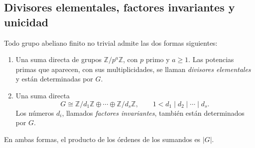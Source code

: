 \subsection{Divisores elementales, factores invariantes y unicidad}
\begin{teo}\label{teo:C10-clasificacion}
Todo grupo abeliano finito no trivial admite las dos formas siguientes:
\begin{enumerate}
\item Una suma directa de grupos $\mathbb Z/p^{a}\mathbb Z$, con $p$ primo y $a\ge1$. Las potencias primas que aparecen, con sus multiplicidades, se llaman \emph{divisores elementales} y están determinadas por $G$.
\item Una suma directa
\[
G\cong\mathbb Z/d_1\mathbb Z\oplus\cdots\oplus\mathbb Z/d_s\mathbb Z,
\qquad 1<d_1\mid d_2\mid\cdots\mid d_s.
\]
Los números $d_i$, llamados \emph{factores invariantes}, también están determinados por $G$.
\end{enumerate}
En ambas formas, el producto de los órdenes de los sumandos es $|G|$.
\end{teo}
